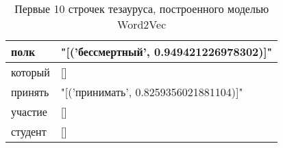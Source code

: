 \documentclass[coursework]{SCWorks}
\begin{document}
\begin{table}[!h]
\begin{tabular}{|l|l|}
    полк                                & "{[}('бессмертный', 0.949421226978302){]}"                                                                                                                                                                                                                                                                                                                                                    \\ \hline
    который                             & {[}{]}                                                                                                                                                                                                                                                                                                                                                                                        \\ \hline
    принять                             & "{[}('принимать', 0.8259356021881104){]}"                                                                                                                                                                                                                                                                                                                                                     \\ \hline
    участие                             & {[}{]}                                                                                                                                                                                                                                                                                                                                                                                        \\ \hline
    студент                             & {[}{]}                                                                                                                                                                                                                                                                                                                                                                                        \\ \hline
    \end{tabular}
    \caption{Первые 10 строчек тезауруса, построенного моделью Word2Vec}
\end{table}
\end{document}

